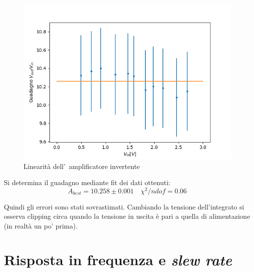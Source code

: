 \documentclass[10pt,a4paper]{article}
\begin{document}
	\begin{figure}\centering
			\includegraphics[scale=0.5]{fit.png}
				\caption{\small Linearit\`a dell'~amplificatore invertente}
			\label{fit}
	\end{figure}

	
	Si determina il guadagno mediante fit dei dati ottenuti:
	\[
	A_{best} = 10.258 \pm 0.001 \quad  \chi^2/ndof = 0.06
	\]

	Quindi gli errori sono stati sovrastimati.
	Cambiando la tensione dell'integrato si osserva clipping circa quando la tensione in uscita è pari a quella di alimentazione (in realtà un po' prima).
	
	\section{Risposta in frequenza e \emph{slew rate}}
\end{document}

